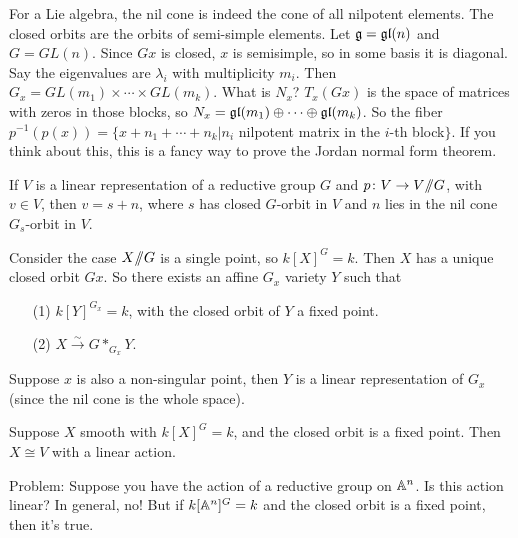 \begin{example}
 For a Lie algebra, the nil cone is indeed the cone of all nilpotent elements. The closed orbits are the orbits of semi-simple elements. Let $\g=\gl(n)$ and $G=GL(n)$. Since $Gx$ is closed, $x$ is semisimple, so in some basis it is diagonal. Say the eigenvalues are $\lambda_i$ with multiplicity $m_i$. Then $G_x = GL(m_1)\times\cdots\times GL(m_k)$. What is $N_x$? $T_x(Gx)$ is the space of matrices with zeros in those blocks, so $N_x=\gl(m_1)\oplus\cdots \oplus \gl(m_k)$. So the fiber $p^{-1}(p(x))=\{x+n_1+\cdots +n_k|n_i$ nilpotent matrix in the $i$-th block$\}$. If you think about this, this is a fancy way to prove the Jordan normal form theorem.
\end{example}

If $V$ is a linear representation of a reductive group $G$ and $p\colon V\to V\quot G$, with $v\in V$, then $v=s+n$, where $s$ has closed $G$-orbit in $V$ and $n$ lies in the nil cone $G_s$-orbit in $V$.

Consider the case $X\quot G$ is a single point, so $k[X]^G=k$. Then $X$ has a unique closed orbit $Gx$. So there exists an affine $G_x$ variety $Y$ such that 
\begin{itemize}
 \item[(1)] $k[Y]^{G_x}=k$, with the closed orbit of $Y$ a fixed point.
 \item[(2)] $X\xrightarrow\sim G*_{G_x}Y$.
\end{itemize}
Suppose $x$ is also a non-singular point, then $Y$ is a linear representation of $G_x$ (since the nil cone is the whole space). \anton{!}

\begin{corollary}
 Suppose $X$ smooth with $k[X]^G=k$, and the closed orbit is a fixed point. Then $X\cong V$ with a linear action.
\end{corollary}

Problem: Suppose you have the action of a reductive group on $\AA^n$. Is this action linear? In general, no! But if $k[\AA^n]^G=k$ and the closed orbit is a fixed point, then it's true.
